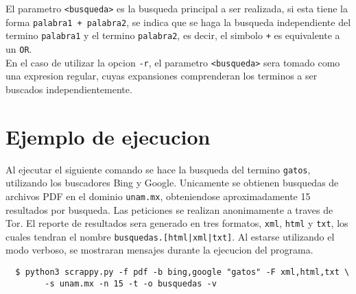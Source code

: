 \documentclass[12pt]{article}
\begin{document}
El parametro \texttt{<busqueda>} es la busqueda principal a ser realizada, si esta tiene la forma \texttt{palabra1 + palabra2}, se indica que se haga la busqueda independiente del termino \texttt{palabra1} y el termino \texttt{palabra2}, es decir, el simbolo \texttt{+} es equivalente a un \texttt{OR}. \\

En el caso de utilizar la opcion \texttt{-r}, el parametro \texttt{<busqueda>} sera tomado como una expresion regular, cuyas expansiones comprenderan los terminos a ser buscados independientemente.

\section{Ejemplo de ejecucion}

Al ejecutar el siguiente comando se hace la busqueda del termino \texttt{gatos}, utilizando los buscadores Bing y Google. Unicamente se obtienen busquedas de archivos PDF en el dominio \texttt{unam.mx}, obteniendose aproximadamente 15 resultados por busqueda. Las peticiones se realizan anonimamente a traves de Tor. El reporte de resultados sera generado en tres formatos, \texttt{xml}, \texttt{html} y \texttt{txt}, los cuales tendran el nombre \texttt{busquedas.[html|xml|txt]}. Al estarse utilizando el modo verboso, se mostraran mensajes durante la ejecucion del programa.
\begin{verbatim}
  $ python3 scrappy.py -f pdf -b bing,google "gatos" -F xml,html,txt \
        -s unam.mx -n 15 -t -o busquedas -v
\end{verbatim}
\end{document}
